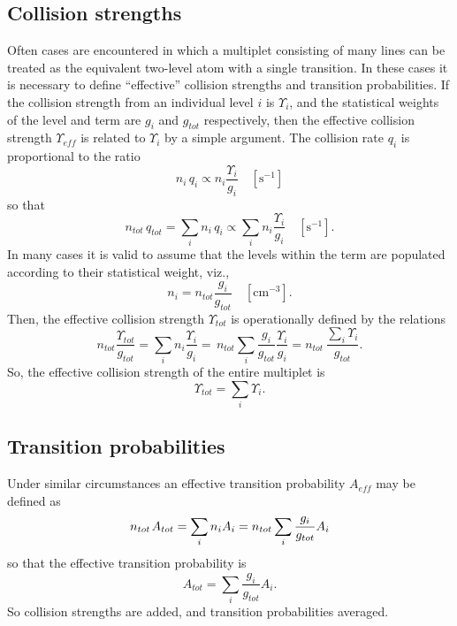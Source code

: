 \subsection{Collision strengths }

Often cases are encountered in which a multiplet consisting of many lines
can be treated as the equivalent two-level atom with a single transition.
In these cases it is necessary to define ``effective'' collision strengths
and transition probabilities.
If the collision strength from an individual
level $i$ is ${\Upsilon _i}$, and the statistical weights of the level and term are $g_i$ and $g_{tot}$
respectively, then the effective collision strength ${\Upsilon _{eff}}$
is related to ${\Upsilon _i}$  by a simple argument.
The collision rate
$q_i$ is proportional to the ratio
\begin{equation}
{n_i}\,{q_i} \propto {n_i}\frac{{{\Upsilon _i}}}{{{g_i}}}\quad
  [\mathrm{s}^{-1}]
\end{equation}
so that
\begin{equation}
{n_{tot}}\,{q_{tot}} = \sum\limits_i {{n_i}\,{q_i}}  \propto \sum\limits_i
{{n_i}\frac{{{\Upsilon _i}}}{{{g_i}}}}\quad
  [\mathrm{s}^{-1}].
\end{equation}
In many cases it is valid to assume that the levels within the term are
populated according to their statistical weight, viz.,
\begin{equation}
{n_i} = {n_{tot}}\frac{{{g_i}}}{{{g_{tot}}}}
\quad  [\mathrm{cm}^{-3}].
\end{equation}
Then, the effective collision strength ${\Upsilon _{tot}}$
is operationally defined by the relations
\begin{equation}
{n_{tot}}\frac{{{\Upsilon _{tot}}}}{{{g_{tot}}}} = \sum\limits_i
{{n_i}\frac{{{\Upsilon _i}}}{{{g_i}}} = \,} {n_{tot}}\sum\limits_i
{\frac{{{g_i}}}{{{g_{tot}}}}\frac{{{\Upsilon _i}}}{{{g_i}}}}  =
{n_{tot}}\,\frac{{\sum\limits_i {{\Upsilon _i}} }}{{{g_{tot}}}}.
\end{equation}
So, the effective collision strength of the entire multiplet is
\begin{equation}
{\Upsilon _{tot}} = \sum\limits_i {{\Upsilon _i}}.
\end{equation}

\subsection{Transition probabilities }

Under similar circumstances an effective transition probability
$A_{eff}$ may be defined as
\begin{equation}
{n_{tot}}{\kern 1pt} {A_{tot}} = \sum\limits_i {{n_i}{A_i}}  =
{n_{tot}}\sum\limits_i {\frac{{{g_i}}}{{{g_{tot}}}}{A_i}}
\end{equation}
so that the effective transition probability is
\begin{equation}
{A_{tot}} = \sum\limits_i {\frac{{{g_i}}}{{{g_{tot}}}}{A_i}}.
\end{equation}
So collision strengths are added, and transition probabilities averaged.

